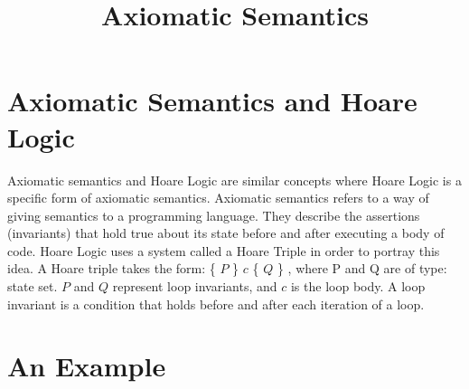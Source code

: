 \documentclass{lecturenotes}
\title{Axiomatic Semantics}
\begin{document}
\maketitle

\section{Axiomatic Semantics and Hoare Logic}

Axiomatic semantics and Hoare Logic are similar concepts where Hoare Logic is a specific form of axiomatic semantics.
Axiomatic semantics refers to a way of giving semantics to a programming language.
They describe the assertions (invariants) that hold true about its state before and after executing a body of code.
Hoare Logic uses a system called a Hoare Triple in order to portray this idea.
A Hoare triple takes the form: \{ $P$ \} $c$ \{ $Q$ \} , where P and Q are of type: state \rightarrow \; set.
$P$ and $Q$ represent loop invariants, and $c$ is the loop body.
A loop invariant is a condition that holds before and after each iteration of a loop. \newline \newline

\section{An Example}
\end{document}
